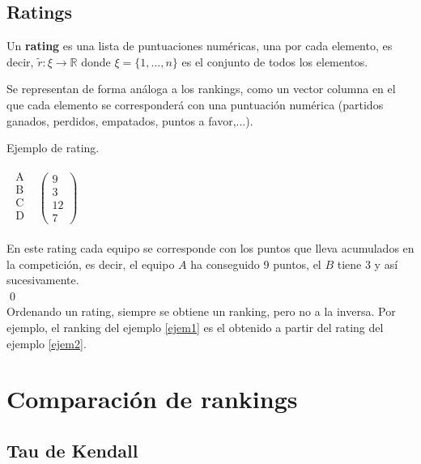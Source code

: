 \subsection*{Ratings}
\begin{defi} 
	Un \textbf{rating} es una lista de puntuaciones numéricas, una por cada elemento, es decir, $\tilde{r}: \xi \rightarrow \mathbb{R}$ donde $\xi = \{1,...,n\}$ es el conjunto de todos los elementos.
\end{defi}

Se representan de forma análoga a los rankings, como un vector columna en el que cada elemento se corresponderá con una puntuación numérica (partidos ganados, perdidos, empatados, puntos a favor,...).

\begin{ejem} \label{ejem2}
Ejemplo de rating.
\end{ejem}
\begin{center}
$\begin{array}{ccc}
\begin{array}{c}
\text{A}\\
\text{B} \\
\text{C} \\
\text{D} \\
\end{array} & \left(\begin{array}{c}
9\\
3\\
12\\
7
\end{array} \right)
\end{array} $ 
\end{center}
En este rating cada equipo se corresponde con los puntos que lleva acumulados en la competición, es decir, el equipo $A$ ha conseguido 9 puntos, el $B$ tiene 3 y así sucesivamente. \\
\qed
\ \\

Ordenando un rating, siempre se obtiene un ranking, pero no a la inversa. Por ejemplo, el ranking del ejemplo \ref{ejem1} es el obtenido a partir del rating del ejemplo \ref{ejem2}.

\section{Comparación de rankings}

\subsection{Tau de Kendall}

